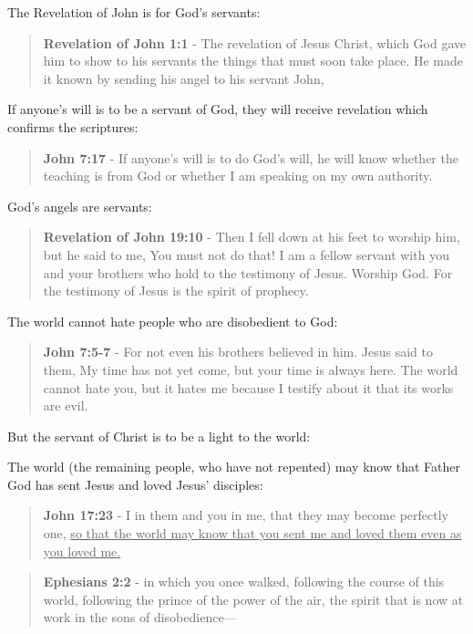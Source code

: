 \documentclass[11pt]{article}
\begin{document}
The Revelation of John is for God's servants:

\begin{quote}
\textbf{Revelation of John 1:1} - The revelation of Jesus Christ, which God gave him to show to his servants the things that must soon take place. He made it known by sending his angel to his servant John,
\end{quote}

If anyone's will is to be a servant of God, they will receive revelation which confirms the scriptures:

\begin{quote}
\textbf{John 7:17} - If anyone's will is to do God's will, he will know whether the teaching is from God or whether I am speaking on my own authority.
\end{quote}

God's angels are servants:

\begin{quote}
\textbf{Revelation of John 19:10} - Then I fell down at his feet to worship him, but he said to me, You must not do that! I am a fellow servant with you and your brothers who hold to the testimony of Jesus. Worship God. For the testimony of Jesus is the spirit of prophecy.
\end{quote}

The world cannot hate people who are disobedient to God:

\begin{quote}
\textbf{John 7:5-7} - For not even his brothers believed in him. Jesus said to them, My time has not yet come, but your time is always here. The world cannot hate you, but it hates me because I testify about it that its works are evil.
\end{quote}

But the servant of Christ is to be a light to the world:

The world (the remaining people, who have not repented) may know that Father God has sent Jesus and loved Jesus' disciples:

\begin{quote}
\textbf{John 17:23} - I in them and you in me, that they may become perfectly one, \uline{so that the world may know that you sent me and loved them even as you loved me.}
\end{quote}

\begin{quote}
\textbf{Ephesians 2:2} - in which you once walked, following the course of this world, following the prince of the power of the air, the spirit that is now at work in the sons of disobedience—
\end{quote}
\end{document}
